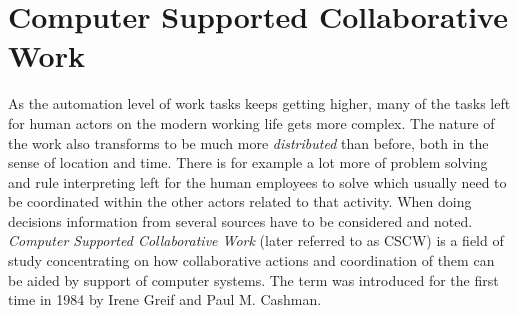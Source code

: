 










\section{Computer Supported Collaborative Work}



As the automation level of work tasks keeps getting higher, many of the tasks left for human actors on the modern working life gets more complex. The nature of the work also transforms to be much more \textit{distributed} than before, both in the sense of location and time. There is for example a lot more of problem solving and rule interpreting left for the human employees to solve which usually need to be coordinated within the other actors related to that activity. When doing decisions information from several sources have to be considered and noted. \textit{Computer Supported Collaborative Work} (later referred to as CSCW) is a field of study concentrating on how collaborative actions and coordination of them can be aided by support of computer systems. The term was introduced for the first time in 1984 by Irene Greif and Paul M. Cashman. \cite{carstensen_computer_1999}

